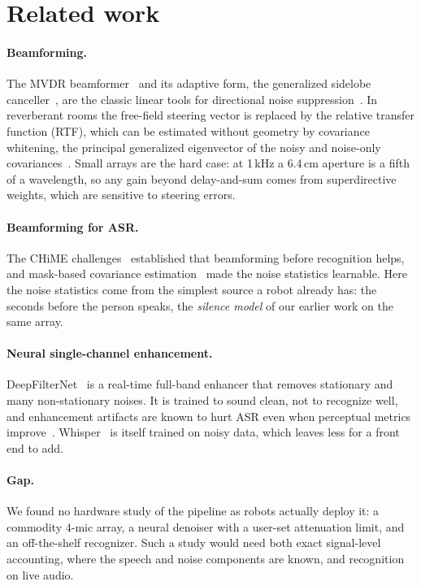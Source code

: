 \section{Related work}
\label{sec:related}

\paragraph{Beamforming.} The MVDR beamformer~\cite{capon1969mvdr} and its
adaptive form, the generalized sidelobe canceller~\cite{griffiths1982gsc},
are the classic linear tools for directional noise
suppression~\cite{benesty2008mvdr,gannot2017consolidated}. In reverberant
rooms the free-field steering vector is replaced by the relative transfer
function (RTF), which can be estimated without geometry by covariance
whitening, the principal generalized eigenvector of the noisy and noise-only
covariances~\cite{markovich2009rtf}. Small arrays are the hard case: at
1\,kHz a 6.4\,cm aperture is a fifth of a wavelength, so any gain beyond
delay-and-sum comes from superdirective weights, which are sensitive to
steering errors.

\paragraph{Beamforming for ASR.} The CHiME challenges~\cite{barker2015chime3}
established that beamforming before recognition helps, and mask-based
covariance estimation~\cite{heymann2016mask} made the noise statistics
learnable. Here the noise statistics come from the simplest source a robot
already has: the seconds before the person speaks, the \emph{silence
model} of our earlier work on the same array.

\paragraph{Neural single-channel enhancement.} DeepFilterNet~\cite{schroeter2022deepfilternet,schroeter2023deepfilternet3}
is a real-time full-band enhancer that removes stationary and many
non-stationary noises. It is trained to sound clean, not to recognize well,
and enhancement artifacts are known to hurt ASR even when perceptual
metrics improve~\cite{iwamoto2022artifacts}. Whisper~\cite{radford2023whisper}
is itself trained on noisy data, which leaves less for a front end to add.

\paragraph{Gap.} We found no hardware study of the pipeline as robots
actually deploy it: a commodity 4-mic array, a neural denoiser with a
user-set attenuation limit, and an off-the-shelf recognizer. Such a study
would need both exact signal-level accounting, where the speech and noise
components are known, and recognition on live audio.
